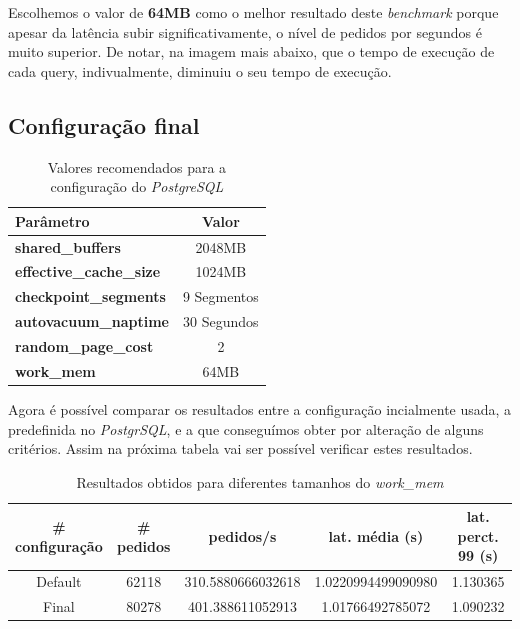 Escolhemos o valor de \textbf{64MB} como o melhor resultado deste \textit{benchmark} porque apesar da latência subir significativamente, o nível de pedidos por segundos é muito superior. De notar, na imagem mais abaixo, que o tempo de execução de cada query, indivualmente, diminuiu o seu tempo de execução.

\subsection{Configuração final}


\begin{table}[!h]
\center
\small
\begin{tabular}{|l|c|}
\hline
\textbf{Parâmetro} & \textbf{Valor} \\ \hline
\textbf{shared\_buffers} & 2048MB  \\ \hline
\textbf{effective\_cache\_size} & 1024MB  \\ \hline
\textbf{checkpoint\_segments} & 9 Segmentos \\ \hline
\textbf{autovacuum\_naptime} & 30 Segundos \\ \hline
\textbf{random\_page\_cost} & 2 \\ \hline
\textbf{work\_mem} & 64MB \\ \hline
\end{tabular}
\caption{Valores recomendados para a configuração do \textit{PostgreSQL}}
\end{table}

Agora é possível comparar os resultados entre a configuração incialmente usada, a predefinida no \textit{PostgrSQL}, e a que conseguímos obter por alteração de alguns critérios. Assim na próxima tabela vai ser possível verificar estes resultados.

\begin{table}[!h]
\center
\small
\begin{tabular}{|c|c|c|c|c|}
\hline
\textbf{\# configuração} & \textbf{\# pedidos} & \textbf{pedidos/s} & \textbf{lat. média (s)} & \textbf{lat. perct. 99 (s)}  \\ \hline
Default & 62118 & 310.5880666032618 & 1.0220994499090980 & 1.130365  \\ \hline
Final & 80278 & 401.388611052913 & 1.01766492785072 & 1.090232  \\ \hline
\end{tabular}
\caption{Resultados obtidos para diferentes tamanhos do \textit{work\_mem}}
\end{table}

